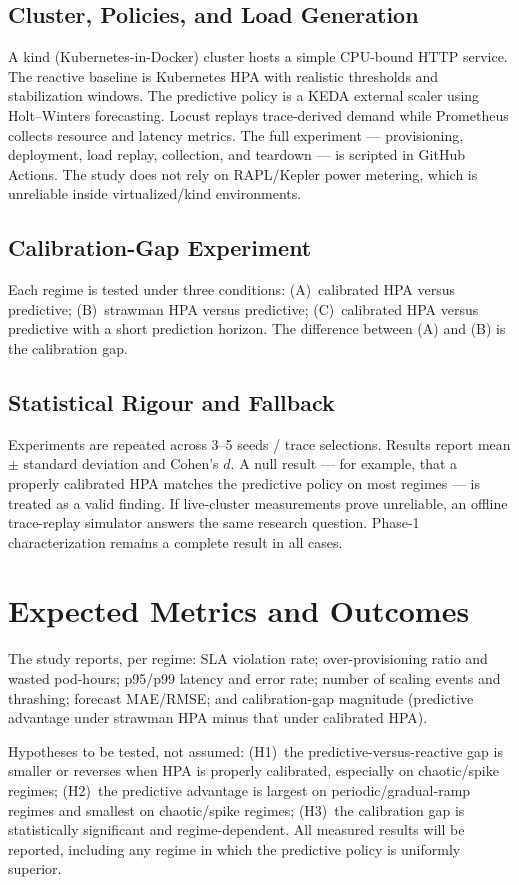 \documentclass[journal]{IEEEtran}
\begin{document}
\subsection{Cluster, Policies, and Load Generation}
A kind (Kubernetes-in-Docker) cluster hosts a simple CPU-bound HTTP service. The reactive baseline is Kubernetes HPA with realistic thresholds and stabilization windows. The predictive policy is a KEDA external scaler using Holt--Winters forecasting. Locust replays trace-derived demand while Prometheus collects resource and latency metrics. The full experiment --- provisioning, deployment, load replay, collection, and teardown --- is scripted in GitHub Actions. The study does not rely on RAPL/Kepler power metering, which is unreliable inside virtualized/kind environments.

\subsection{Calibration-Gap Experiment}
Each regime is tested under three conditions: (A)~calibrated HPA versus predictive; (B)~strawman HPA versus predictive; (C)~calibrated HPA versus predictive with a short prediction horizon. The difference between (A) and (B) is the calibration gap.

\subsection{Statistical Rigour and Fallback}
Experiments are repeated across 3--5 seeds / trace selections. Results report mean $\pm$ standard deviation and Cohen's $d$. A null result --- for example, that a properly calibrated HPA matches the predictive policy on most regimes --- is treated as a valid finding. If live-cluster measurements prove unreliable, an offline trace-replay simulator answers the same research question. Phase-1 characterization remains a complete result in all cases.

\section{Expected Metrics and Outcomes}
The study reports, per regime: SLA violation rate; over-provisioning ratio and wasted pod-hours; p95/p99 latency and error rate; number of scaling events and thrashing; forecast MAE/RMSE; and calibration-gap magnitude (predictive advantage under strawman HPA minus that under calibrated HPA).

Hypotheses to be tested, not assumed: (H1)~the predictive-versus-reactive gap is smaller or reverses when HPA is properly calibrated, especially on chaotic/spike regimes; (H2)~the predictive advantage is largest on periodic/gradual-ramp regimes and smallest on chaotic/spike regimes; (H3)~the calibration gap is statistically significant and regime-dependent. All measured results will be reported, including any regime in which the predictive policy is uniformly superior.
\end{document}
